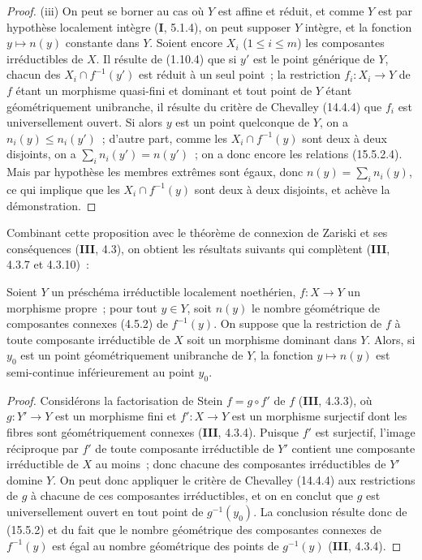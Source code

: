 \begin{proof}
(iii) On peut se borner au cas où $Y$ est affine et réduit, et comme $Y$ est par hypothèse localement intègre (\textbf{I}, 5.1.4), on peut supposer $Y$ intègre, et la fonction $y\mapsto n(y)$ constante dans $Y$. Soient encore $X_i$ ($1\leqslant i\leqslant m$) les composantes irréductibles de $X$. Il résulte de (1.10.4) que si $y'$ est le point générique de $Y$, chacun des $X_i\cap f^{-1}(y')$ est réduit à un seul point~; la restriction $f_i:X_i\to Y$ de $f$ étant un morphisme quasi-fini et dominant et tout point de $Y$ étant géométriquement unibranche, il résulte du critère de Chevalley (14.4.4) que $f_i$ est universellement ouvert. Si alors $y$ est un point quelconque de $Y$, on a $n_i(y)\leqslant n_i(y')$~; d'autre part, comme les $X_i\cap f^{-1}(y)$ sont deux à deux disjoints, on a $\sum_i n_i(y')=n(y')$~; on a donc encore les relations (15.5.2.4). Mais par hypothèse les membres extrêmes sont égaux, donc $n(y)=\sum_i n_i(y)$, ce qui implique que les $X_i\cap f^{-1}(y)$ sont deux à deux disjoints, et achève la démonstration.
\end{proof}

Combinant cette proposition avec le théorème de connexion de Zariski et ses conséquences (\textbf{III}, 4.3), on obtient les résultats suivants qui complètent (\textbf{III}, 4.3.7 et 4.3.10)~:

\begin{proposition}[15.5.3]
\label{IV.15.5.3-fr}
Soient $Y$ un préschéma irréductible localement noethérien, $f:X\to Y$ un morphisme propre~; pour tout $y\in Y$, soit $n(y)$ le nombre géométrique de composantes connexes (4.5.2) de $f^{-1}(y)$. On suppose que la restriction de $f$ à toute composante irréductible de $X$ soit un morphisme dominant dans $Y$. Alors, si $y_0$ est un point géométriquement unibranche de $Y$, la fonction $y\mapsto n(y)$ est semi-continue inférieurement au point $y_0$.
\end{proposition}

\begin{proof}
Considérons la factorisation de Stein $f=g\circ f'$ de $f$ (\textbf{III}, 4.3.3), où $g:Y'\to Y$ est un morphisme fini et $f':X\to Y$ est un morphisme surjectif dont les fibres sont géométriquement connexes (\textbf{III}, 4.3.4). Puisque $f'$ est surjectif, l'image réciproque par $f'$ de toute composante irréductible de $Y'$ contient une composante irréductible de $X$ au moins~; donc chacune des composantes irréductibles de $Y'$ domine $Y$. On peut donc appliquer le critère de Chevalley (14.4.4) aux restrictions de $g$ à chacune de ces composantes irréductibles, et on en conclut que $g$ est universellement ouvert en tout point de $g^{-1}(y_0)$. La conclusion résulte donc de (15.5.2) et du fait que le nombre géométrique des composantes connexes de $f^{-1}(y)$ est égal au nombre géométrique des points de $g^{-1}(y)$ (\textbf{III}, 4.3.4).
\end{proof}

